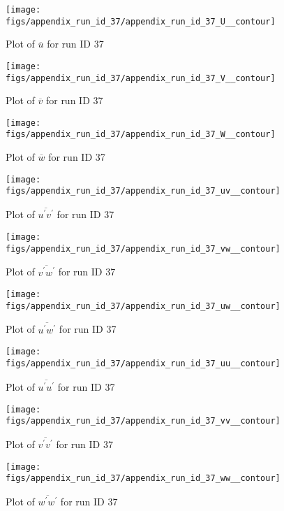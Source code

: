 \begin{figure}[H]
\centering
\texttt{[image: figs/appendix\_run\_id\_37/appendix\_run\_id\_37\_U\_\_contour]}
\caption{Plot of $\overline{u}$ for run ID 37}
\label{fig:appendix_run_id_37_U__contour}
\end{figure}


\begin{figure}[H]
\centering
\texttt{[image: figs/appendix\_run\_id\_37/appendix\_run\_id\_37\_V\_\_contour]}
\caption{Plot of $\overline{v}$ for run ID 37}
\label{fig:appendix_run_id_37_V__contour}
\end{figure}


\begin{figure}[H]
\centering
\texttt{[image: figs/appendix\_run\_id\_37/appendix\_run\_id\_37\_W\_\_contour]}
\caption{Plot of $\overline{w}$ for run ID 37}
\label{fig:appendix_run_id_37_W__contour}
\end{figure}


\begin{figure}[H]
\centering
\texttt{[image: figs/appendix\_run\_id\_37/appendix\_run\_id\_37\_uv\_\_contour]}
\caption{Plot of $\overline{u^\prime v^\prime}$ for run ID 37}
\label{fig:appendix_run_id_37_uv__contour}
\end{figure}


\begin{figure}[H]
\centering
\texttt{[image: figs/appendix\_run\_id\_37/appendix\_run\_id\_37\_vw\_\_contour]}
\caption{Plot of $\overline{v^\prime w^\prime}$ for run ID 37}
\label{fig:appendix_run_id_37_vw__contour}
\end{figure}


\begin{figure}[H]
\centering
\texttt{[image: figs/appendix\_run\_id\_37/appendix\_run\_id\_37\_uw\_\_contour]}
\caption{Plot of $\overline{u^\prime w^\prime}$ for run ID 37}
\label{fig:appendix_run_id_37_uw__contour}
\end{figure}


\begin{figure}[H]
\centering
\texttt{[image: figs/appendix\_run\_id\_37/appendix\_run\_id\_37\_uu\_\_contour]}
\caption{Plot of $\overline{u^\prime u^\prime}$ for run ID 37}
\label{fig:appendix_run_id_37_uu__contour}
\end{figure}


\begin{figure}[H]
\centering
\texttt{[image: figs/appendix\_run\_id\_37/appendix\_run\_id\_37\_vv\_\_contour]}
\caption{Plot of $\overline{v^\prime v^\prime}$ for run ID 37}
\label{fig:appendix_run_id_37_vv__contour}
\end{figure}


\begin{figure}[H]
\centering
\texttt{[image: figs/appendix\_run\_id\_37/appendix\_run\_id\_37\_ww\_\_contour]}
\caption{Plot of $\overline{w^\prime w^\prime}$ for run ID 37}
\label{fig:appendix_run_id_37_ww__contour}
\end{figure}


